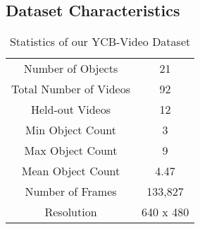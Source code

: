 \documentclass[conference]{IEEEtran}
\begin{document}

\subsection{Dataset Characteristics}

\begin{table}
	\centering
	\caption{\small Statistics of our YCB-Video Dataset}
	\label{tab:DatasetStatistics}
	\begin{tabular}{ | c | c | }
		\hline			
		Number of Objects & 21 \\
		Total Number of Videos & 92 \\
		Held-out Videos & 12 \\
		Min Object Count & 3 \\
		Max Object Count & 9 \\
		Mean Object Count & 4.47 \\
		Number of Frames & 133,827 \\
		Resolution & 640 x 480 \\
		\hline
	\end{tabular}
	\vspace{-2mm}
\end{table}
\end{document}
